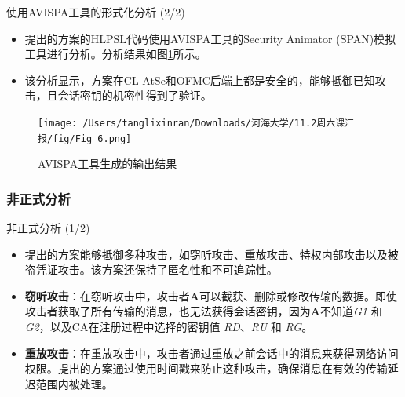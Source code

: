 \documentclass{beamer}
\begin{document}
\begin{frame}{使用AVISPA工具的形式化分析 (2/2)}
    \begin{itemize}
        \item 提出的方案的HLPSL代码使用AVISPA工具的Security Animator (SPAN)模拟工具进行分析。分析结果如图\ref{Fig_6}所示。
        \item 该分析显示，方案在CL-AtSe和OFMC后端上都是安全的，能够抵御已知攻击，且会话密钥的机密性得到了验证。
    \end{itemize}

    \begin{figure}
        \centering
        \texttt{[image: /Users/tanglixinran/Downloads/河海大学/11.2周六课汇报/fig/Fig\_6.png]} %
        \caption{AVISPA工具生成的输出结果}
        \label{Fig_6}
    \end{figure}
\end{frame}

\subsubsection{非正式分析}
\begin{frame}{非正式分析 (1/2)}
    \begin{itemize}
        \item 提出的方案能够抵御多种攻击，如窃听攻击、重放攻击、特权内部攻击以及被盗凭证攻击。该方案还保持了匿名性和不可追踪性。
        
        \item \textbf{窃听攻击}：在窃听攻击中，攻击者\textbf{A}可以截获、删除或修改传输的数据。即使攻击者获取了所有传输的消息，也无法获得会话密钥，因为\textbf{A}不知道\textit{G1} 和 \textit{G2}，以及CA在注册过程中选择的密钥值 \textit{RD}、\textit{RU} 和 \textit{RG}。
        
        \item \textbf{重放攻击}：在重放攻击中，攻击者通过重放之前会话中的消息来获得网络访问权限。提出的方案通过使用时间戳来防止这种攻击，确保消息在有效的传输延迟范围内被处理。
    \end{itemize}
\end{frame}
\end{document}
